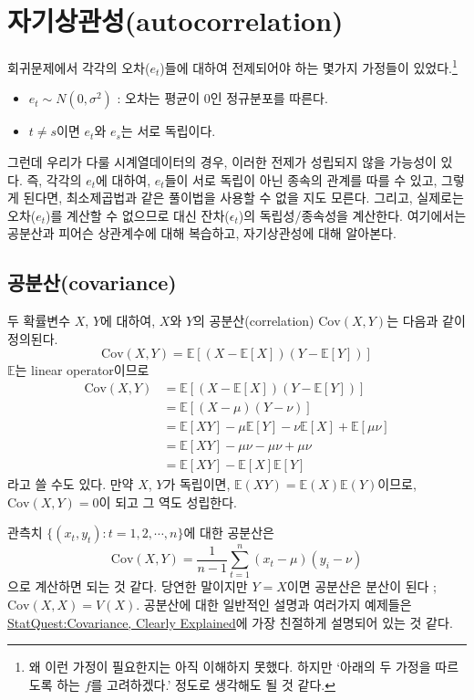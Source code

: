 \documentclass{article}
\begin{document}
\section{자기상관성(autocorrelation)}
회귀문제에서 각각의 오차(\(e_t\))들에 대하여 전제되어야 하는 몇가지 가정들이 있었다.\footnote{왜 이런 가정이 필요한지는 아직 이해하지 못했다.
하지만 `아래의 두 가정을 따르도록 하는 \(f\)를 고려하겠다.' 정도로 생각해도 될 것 같다.}
\begin{itemize}
\item
\(e_t\sim N(0,\sigma^2)\) : 오차는 평균이 0인 정규분포를 따른다.
\item
\(t\neq s\)이면 \(e_t\)와 \(e_s\)는 서로 독립이다.
\end{itemize}
그런데 우리가 다룰 시계열데이터의 경우, 이러한 전제가 성립되지 않을 가능성이 있다.
즉, 각각의 \(e_t\)에 대하여, \(e_t\)들이 서로 독립이 아닌 종속의 관계를 따를 수 있고, 그렇게 된다면, 최소제곱법과 같은 풀이법을 사용할 수 없을 지도 모른다.
그리고, 실제로는 오차(\(e_t\))를 계산할 수 없으므로 대신 잔차(\(\epsilon_t\))의 독립성/종속성을 계산한다.
여기에서는 공분산과 피어슨 상관계수에 대해 복습하고, 자기상관성에 대해 알아본다.

\subsection{공분산(covariance)}
두 확률변수 \(X\), \(Y\)에 대하여, \(X\)와 \(Y\)의 공분산(correlation) \(\text{Cov}(X,Y)\)는  다음과 같이 정의된다.
\begin{equation}
\text{Cov}(X,Y)=\mathbb E[(X-\mathbb E[X])(Y-\mathbb E[Y])]
\end{equation}
\(\mathbb E\)는 linear operator이므로
\begin{align*}
\text{Cov}(X,Y)
&=\mathbb E[(X-\mathbb E[X])(Y-\mathbb E[Y])]\\
&=\mathbb E[(X-\mu)(Y-\nu)]\\
&=\mathbb E[XY]-\mu\mathbb E[Y]-\nu\mathbb E[X]+\mathbb E[\mu\nu]\\
&=\mathbb E[XY]-\mu\nu-\mu\nu+\mu\nu\\
&=\mathbb E[XY]-\mathbb E[X]\mathbb E[Y]
\end{align*}
라고 쓸 수도 있다.
만약 \(X\), \(Y\)가 독립이면, \(\mathbb E(XY)=\mathbb E(X)\mathbb E(Y)\)이므로, \(\text{Cov}(X,Y)=0\)이 되고 그 역도 성립한다.

관측치 \(\{(x_t, y_t):t=1,2,\cdots,n\}\)에 대한 공분산은
\[\text{Cov}(X,Y)=\frac1{n-1}\sum_{t=1}^n(x_t-\mu)(y_i-\nu)\]
으로 계산하면 되는 것 같다.
당연한 말이지만 \(Y=X\)이면 공분산은 분산이 된다 ; \(\text{Cov}(X,X)=V(X)\).
공분산에 대한 일반적인 설명과 여러가지 예제들은 \href{https://youtu.be/qtaqvPAeEJY}{StatQuest:Covariance, Clearly Explained}에 가장 친절하게 설명되어 있는 것 같다.
\end{document}
